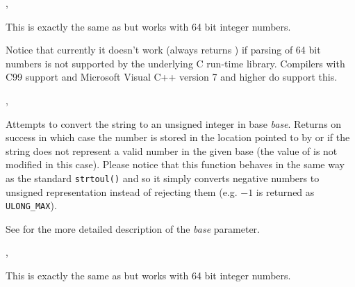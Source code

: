 
,\\


\label{wxstringtolonglong}


This is exactly the same as  but works with 64
bit integer numbers.

Notice that currently it doesn't work (always returns \false) if parsing of 64
bit numbers is not supported by the underlying C run-time library. Compilers
with C99 support and Microsoft Visual C++ version 7 and higher do support this.


,\\


\label{wxstringtoulong}


Attempts to convert the string to an unsigned integer in base {\it base}.
Returns \true on success in which case the number is stored in the
location pointed to by  or \false if the string does not
represent a valid number in the given base (the value of  is not
modified in this case). Please notice that this function
behaves in the same way as the standard \texttt{strtoul()} and so it simply
converts negative numbers to unsigned representation instead of rejecting them
(e.g. $-1$ is returned as \texttt{ULONG\_MAX}).

See  for the more detailed
description of the {\it base} parameter.


,\\


\label{wxstringtoulonglong}


This is exactly the same as  but works with 64
bit integer numbers.

